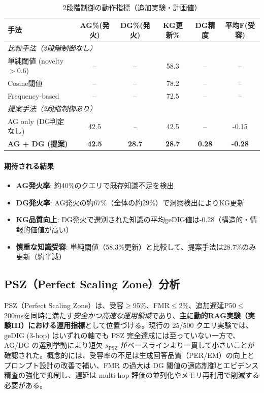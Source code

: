 \documentclass[ja=standard,xelatex]{bxjsarticle}
\begin{document}
\begin{table}[H]
\centering
\caption{2段階制御の動作指標（追加実験・計画値）}
\label{tab:rag_two_stage_control}
\begin{tabular}{lccccc}
\toprule
手法 & AG\%(発火) & DG\%(発火) & KG更新\% & DG精度 & 平均F(受容) \\
\midrule
\multicolumn{6}{l}{\textit{比較手法（2段階制御なし）}} \\
単純閾値 (novelty$>$0.6) & -- & -- & 58.3 & -- & -- \\
Cosine閾値 & -- & -- & 78.2 & -- & -- \\
Frequency-based & -- & -- & 72.5 & -- & -- \\
\midrule
\multicolumn{6}{l}{\textit{提案手法（2段階制御あり）}} \\
AG only (DG判定なし) & 42.5 & -- & 42.5 & -- & -0.15 \\
\textbf{AG + DG (提案)} & \textbf{42.5} & \textbf{28.7} & \textbf{28.7} & \textbf{0.28} & \textbf{-0.28} \\
\bottomrule
\end{tabular}
\end{table}

\paragraph{期待される結果}
\begin{itemize}
  \item \textbf{AG発火率}: 約40\%のクエリで既存知識不足を検出
  \item \textbf{DG発火率}: AG発火の約67\%（全体の約29\%）で洞察検出によりKG更新
  \item \textbf{KG品質向上}: DG発火で選別された知識の平均geDIG値は-0.28（構造的・情報的価値が高い）
  \item \textbf{慎重な知識受容}: 単純閾値（58.3\%更新）と比較して、提案手法は28.7\%のみ更新（約半減）
\end{itemize}

\subsection{PSZ（Perfect Scaling Zone）分析}
PSZ（Perfect Scaling Zone）は、受容$\ge$95\%、FMR$\le$2\%、追加遅延P50$\le$200msを同時に満たす\emph{安全かつ高速な運用領域}であり、\textbf{主に動的RAG実験（実験III）における運用指標}として位置づける。現行の 25/500 クエリ実験では、geDIG (3-hop) はいずれの軸でも PSZ 完全達成には至っていない一方で、AG/DG の選別挙動により短欠 $s_{\mathrm{PSZ}}$ がベースラインより一貫して小さいことが確認された。概念的には、受容率の不足は生成回答品質（PER/EM）の向上とプロンプト設計の改善で補い、FMR の過大は DG 閾値の適応制御とエビデンス精査の強化で抑制し、遅延は multi-hop 評価の並列化やメモリ再利用で削減する必要がある。
\end{document}
